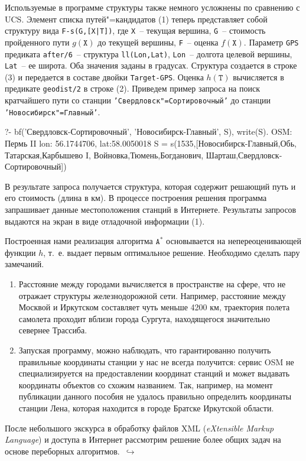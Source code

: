 \documentclass[a4paper,14pt, openany, twoside, draft]{extbook} %
\newcommand{\eeng}[1]{\emph{\foreignlanguage{english}{#1}}}
\newcommand{\aaa}[2][acolor]{\noindent\textcolor{eclr}%
{+\ [}\textcolor{#1}{#2}\textcolor{eclr}{]}}
\newcommand{\goforth}[1]{$\,\hookrightarrow$\pageref{#1}}
\begin{document}
Используемые в программе структуры также немного усложнены по сравнению с UCS.  Элемент списка путей"=кандидатов (1) теперь представляет собой структуру вида \texttt{F-s(G,[X|T])}, где \texttt{X}~-- текущая вершина, \texttt{G}~-- стоимость пройденного пути $g(\mathtt{X})$ до текущей вершины, \texttt{F}~-- оценка $f(\mathtt{X})$.  Параметр \texttt{GPS} предиката \texttt{after/6}~-- структура \texttt{ll(Lon,Lat)}, \texttt{Lon}~-- долгота целевой вершины, \texttt{Lat}~-- ее широта.   Оба значения заданы в градусах.  Структура создается в строке (3) и передается в составе двойки \texttt{Target-GPS}.  Оценка $h(\mathtt{T})$ вычисляется в предикате \texttt{geodist/2} в строке (2).  Приведем пример запроса на поиск кратчайшего пути со станции \texttt{'Свердловск"=Сортировочный'} до станции \texttt{'Новосибирск"=Главный'}.

\begin{proexp}
?- bf('Свердловск-Сортировочный',
   'Новосибирск-Главный', S), write(S).
OSM: Пермь II
    lon: 56.1744706, lat:58.0050018    %
S = s(1535,[Новосибирск-Главный,Обь,
    Татарская,Карбышево I,
    Войновка,Тюмень,Богданович,
    Шарташ,Свердловск-Сортировочный])
\end{proexp}


В результате запроса получается структура, которая содержит решающий путь и его стоимость (длина в км).  В процессе построения решения программа запрашивает данные местоположения станций в Интернете.  Результаты запросов выдаются на экран в виде отладочной информации (1).


Построенная нами реализация алгоритма $\mathtt{A}^*$ основывается на непереоценивающей функции $h$, т.~е. выдает первым оптимальное решение.  Необходимо сделать пару замечаний.
\begin{enumerate}
\item Расстояние между городами вычисляется в пространстве на сфере, что не отражает структуры железнодорожной сети.  Например, расстояние между Москвой и Иркутском составляет чуть меньше 4200 км,  траектория полета самолета проходит вблизи города Сургута, находящегося значительно севернее Трассиба.
\item Запуская программу, можно наблюдать, что гарантированно получить правильные координаты станции у нас не всегда получится: сервис OSM не специализируется на предоставлении координат станций и может выдавать координаты объектов со схожим названием.  Так, например, на момент публикации данного пособия не удалось правильно определить координаты станции Лена, которая находится в городе Братске Иркутской области.
\end{enumerate}
После небольшого экскурса в обработку файлов XML (\eeng{eXtensible Markup Language}) \cite{xml} и доступа в Интернет рассмотрим решение более общих задач на основе переборных алгоритмов.  \goforth{sec:britmuseum}
\end{document}
